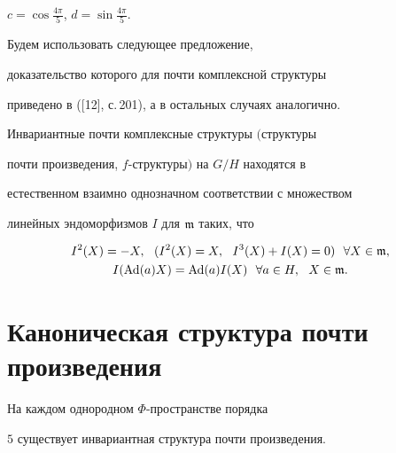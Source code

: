 $c=\cos\frac{4\pi}{5}$, $d=\sin\frac{4\pi}{5}$.





Будем использовать следующее предложение,


доказательство которого для почти комплексной структуры


приведено в ([12], с.\,201), а в остальных случаях аналогично.





\begin{lem}


Инвариантные почти комплексные структуры $($структуры


почти произведения, $f$-структуры$)$ на $G/H$ находятся в


естественном взаимно однозначном соответствии с множеством


линейных эндоморфизмов $I$ для $\frak{m}$ таких, что


\begin{gather}\label{3}


I^2(X)=-X, \ \ (I^2(X)=X,\ \ I^3(X)+I(X)=0)\ \ \forall X \in \frak{m},\\


\label{4}


I(\Ad(a)X)=\Ad(a)I(X)\ \ \forall a \in H,\ \ X \in \frak{m}.


\end{gather}


\end{lem}





\section{Каноническая структура почти произведения}





\begin{thm}


На каждом однородном $\Phi$-пространстве порядка


$5$ существует инвариантная структура почти произведения.


\end{thm}





